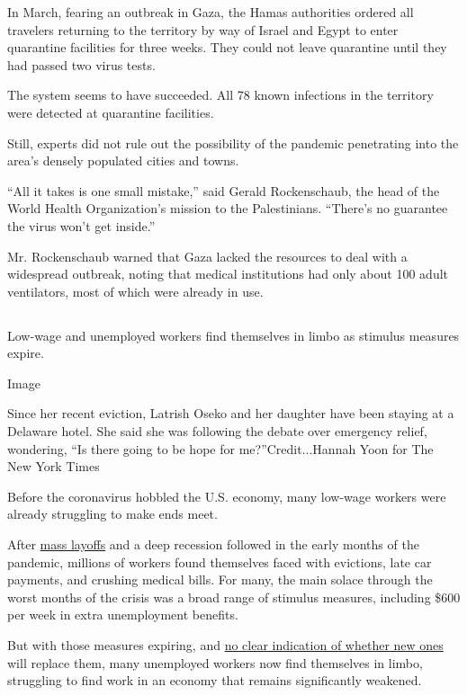 In March, fearing an outbreak in Gaza, the Hamas authorities ordered all
travelers returning to the territory by way of Israel and Egypt to enter
quarantine facilities for three weeks. They could not leave quarantine
until they had passed two virus tests.

The system seems to have succeeded. All 78 known infections in the
territory were detected at quarantine facilities.

Still, experts did not rule out the possibility of the pandemic
penetrating into the area's densely populated cities and towns.

``All it takes is one small mistake,'' said Gerald Rockenschaub, the
head of the World Health Organization's mission to the Palestinians.
``There's no guarantee the virus won't get inside.''

Mr. Rockenschaub warned that Gaza lacked the resources to deal with a
widespread outbreak, noting that medical institutions had only about 100
adult ventilators, most of which were already in use.

\hypertarget{section-4}{%
\subsection{}\label{section-4}}

Low-wage and unemployed workers find themselves in limbo as stimulus
measures expire.

Image

Since her recent eviction, Latrish Oseko and her daughter have been
staying at a Delaware hotel. She said she was following the debate over
emergency relief, wondering, ``Is there going to be hope for
me?''Credit...Hannah Yoon for The New York Times

Before the coronavirus hobbled the U.S. economy, many low-wage workers
were already struggling to make ends meet.

After
\href{https://www.nytimes.com/interactive/2020/08/05/upshot/us-unemployment-maps-coronavirus.html}{mass
layoffs} and a deep recession followed in the early months of the
pandemic, millions of workers found themselves faced with evictions,
late car payments, and crushing medical bills. For many, the main solace
through the worst months of the crisis was a broad range of stimulus
measures, including \$600 per week in extra unemployment benefits.

But with those measures expiring, and
\href{https://www.nytimes.com/2020/08/07/us/politics/trump-congress-stimulus.html}{no
clear indication of whether new ones} will replace them, many unemployed
workers now find themselves in limbo, struggling to find work in an
economy that remains significantly weakened.

